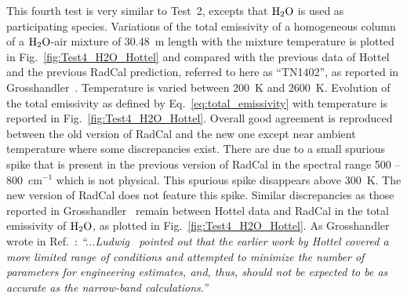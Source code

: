 This fourth test is very similar to Test~2, excepts that $\rm H_2O$ is used as participating species. Variations of the total emissivity of a homogeneous column of a $\rm H_2O$-air mixture of 30.48~m length with the mixture temperature is plotted in Fig.~\ref{fig:Test4_H2O_Hottel} and compared with the previous data of Hottel and the previous RadCal prediction, referred to here as ``TN1402'', as reported in Grosshandler~\cite{Grosshandler1993}. Temperature is varied between 200~K and 2600~K. Evolution of the total emissivity as defined by Eq.~\ref{eq:total_emissivity} with temperature is reported in Fig.~\ref{fig:Test4_H2O_Hottel}. Overall good agreement is reproduced between the old version of RadCal and the new one except near ambient temperature where some discrepancies exist. There are due to a small spurious spike that is present in the previous version of RadCal in the spectral range 500 -- 800~cm$^{-1}$ which is not physical. This spurious spike disappears above 300~K. The new version of RadCal does not feature this spike. Similar discrepancies as those reported in Grosshandler~\cite{Grosshandler1993} remain between Hottel data and RadCal in the total emissivity of $\rm H_2O$, as plotted in Fig.~\ref{fig:Test4_H2O_Hottel}. As Grosshandler wrote in Ref.~\cite{Grosshandler1993}: \textit{``...Ludwig~\cite{Ludwig1973} pointed out that the earlier work by Hottel covered a more limited range of conditions and attempted to minimize the number of parameters for engineering estimates, and, thus, should not be expected to be as accurate as the narrow-band calculations.''}

